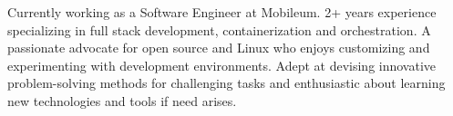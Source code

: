 

\begin{cvparagraph}

Currently working as a Software Engineer at Mobileum. 2+ years experience specializing in full stack development, containerization and orchestration. A passionate advocate for open source and Linux who enjoys customizing and experimenting with development environments. Adept at devising innovative problem-solving methods for challenging tasks and enthusiastic about learning new technologies and tools if need arises.
\end{cvparagraph}
